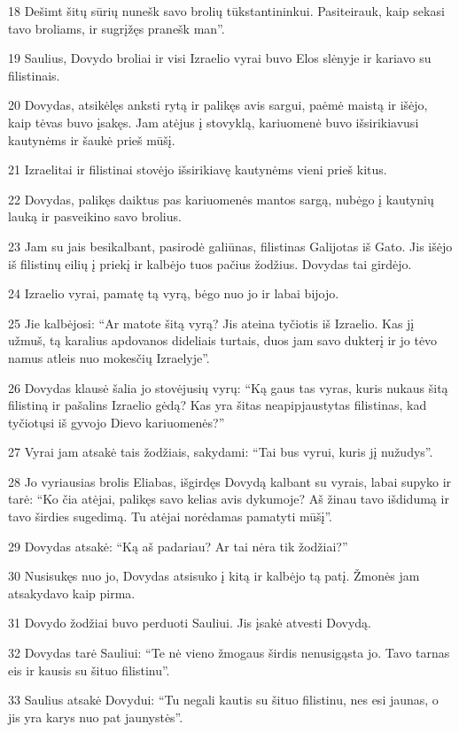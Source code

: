\par 18 Dešimt šitų sūrių nunešk savo brolių tūkstantininkui. Pasiteirauk, kaip sekasi tavo broliams, ir sugrįžęs pranešk man”. 
\par 19 Saulius, Dovydo broliai ir visi Izraelio vyrai buvo Elos slėnyje ir kariavo su filistinais. 
\par 20 Dovydas, atsikėlęs anksti rytą ir palikęs avis sargui, paėmė maistą ir išėjo, kaip tėvas buvo įsakęs. Jam atėjus į stovyklą, kariuomenė buvo išsirikiavusi kautynėms ir šaukė prieš mūšį. 
\par 21 Izraelitai ir filistinai stovėjo išsirikiavę kautynėms vieni prieš kitus. 
\par 22 Dovydas, palikęs daiktus pas kariuomenės mantos sargą, nubėgo į kautynių lauką ir pasveikino savo brolius. 
\par 23 Jam su jais besikalbant, pasirodė galiūnas, filistinas Galijotas iš Gato. Jis išėjo iš filistinų eilių į priekį ir kalbėjo tuos pačius žodžius. Dovydas tai girdėjo. 
\par 24 Izraelio vyrai, pamatę tą vyrą, bėgo nuo jo ir labai bijojo. 
\par 25 Jie kalbėjosi: “Ar matote šitą vyrą? Jis ateina tyčiotis iš Izraelio. Kas jį užmuš, tą karalius apdovanos dideliais turtais, duos jam savo dukterį ir jo tėvo namus atleis nuo mokesčių Izraelyje”. 
\par 26 Dovydas klausė šalia jo stovėjusių vyrų: “Ką gaus tas vyras, kuris nukaus šitą filistiną ir pašalins Izraelio gėdą? Kas yra šitas neapipjaustytas filistinas, kad tyčiotųsi iš gyvojo Dievo kariuomenės?” 
\par 27 Vyrai jam atsakė tais žodžiais, sakydami: “Tai bus vyrui, kuris jį nužudys”. 
\par 28 Jo vyriausias brolis Eliabas, išgirdęs Dovydą kalbant su vyrais, labai supyko ir tarė: “Ko čia atėjai, palikęs savo kelias avis dykumoje? Aš žinau tavo išdidumą ir tavo širdies sugedimą. Tu atėjai norėdamas pamatyti mūšį”. 
\par 29 Dovydas atsakė: “Ką aš padariau? Ar tai nėra tik žodžiai?” 
\par 30 Nusisukęs nuo jo, Dovydas atsisuko į kitą ir kalbėjo tą patį. Žmonės jam atsakydavo kaip pirma. 
\par 31 Dovydo žodžiai buvo perduoti Sauliui. Jis įsakė atvesti Dovydą. 
\par 32 Dovydas tarė Sauliui: “Te nė vieno žmogaus širdis nenusigąsta jo. Tavo tarnas eis ir kausis su šituo filistinu”. 
\par 33 Saulius atsakė Dovydui: “Tu negali kautis su šituo filistinu, nes esi jaunas, o jis yra karys nuo pat jaunystės”. 
